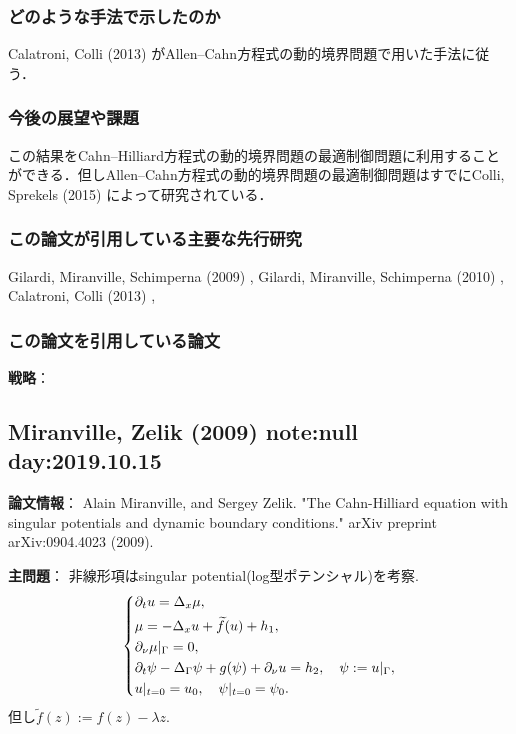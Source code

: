 \documentclass[openary, a4paper, oneside]{jsarticle}
\begin{document}
	\subsubsection{どのような手法で示したのか}
	Calatroni, Colli (2013) \cite{CalatroniColli2013} がAllen--Cahn方程式の動的境界問題で用いた手法に従う．
	\subsubsection{今後の展望や課題}
	この結果をCahn--Hilliard方程式の動的境界問題の最適制御問題に利用することができる．但しAllen--Cahn方程式の動的境界問題の最適制御問題はすでにColli, Sprekels (2015) \cite{ColliSprekels2015} によって研究されている．
	\subsubsection{この論文が引用している主要な先行研究}
	Gilardi, Miranville, Schimperna (2009) \cite{GilardiMiranvilleSchimperna2009},
	Gilardi, Miranville, Schimperna (2010) \cite{GilardiMiranvilleSchimperna2010},
	Calatroni, Colli (2013) \cite{CalatroniColli2013},

	\subsubsection{この論文を引用している論文}


{\bf 戦略}：



\newpage

\subsection{Miranville, Zelik (2009) \cite{MiranvilleZelik2009} note:null day:2019.10.15}
{\bf 論文情報}：
Alain Miranville, and Sergey Zelik. "The Cahn-Hilliard equation with singular potentials and dynamic boundary conditions." arXiv preprint arXiv:0904.4023 (2009).

{\bf 主問題}：
非線形項はsingular potential(log型ポテンシャル)を考察.
\begin{equation}\left\{\begin{aligned}
	&\partial_t u = \Delta_x \mu,\\
	&\mu = -\Delta_x u + \widetilde{f}(u) + h_1,\\
	&\partial_{\nu}\mu|_{\Gamma} = 0,\\
	&\partial_t\psi - \Delta_{\Gamma}\psi + g(\psi) +\partial_{\nu} u = h_2,\quad \psi := u|_{\Gamma},\\
	&u|_{t=0} = u_0,\quad \psi|_{t=0} = \psi_0.
\end{aligned}\right.\end{equation}
但し$\tilde{f}(z) := f(z) - \lambda z$.
\end{document}
